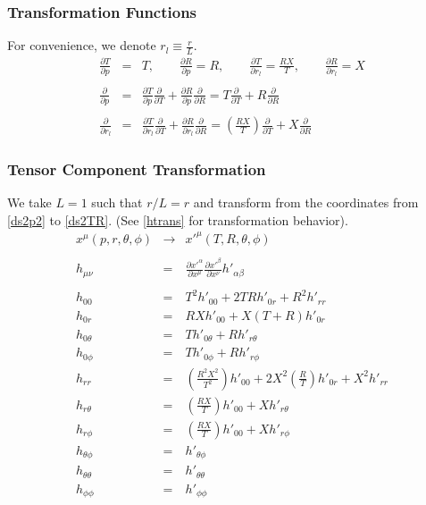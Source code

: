 \documentclass[10pt,letterpaper]{article}
\numberwithin{equation}{section}
\begin{document}
\subsubsection{Transformation Functions}
For convenience, we denote $r_l \equiv \frac{r}{L}$.
\begin{eqnarray}
\frac{\partial T}{\partial p} &=& T,\qquad \frac{\partial R}{\partial p} = R,\qquad
\frac{\partial T}{\partial r_l} = \frac{RX}{T},\qquad \frac{\partial R}{\partial r_l} = X
\\ \nonumber\\
\frac{\partial}{\partial p} &=& \frac{\partial T}{\partial p}\frac{\partial}{\partial T} + \frac{\partial R}{\partial p}\frac{\partial}{\partial R} = T\frac{\partial}{\partial T} + R\frac{\partial}{\partial R}
\\ \nonumber\\
\frac{\partial}{\partial r_l} &=& \frac{\partial T}{\partial r_l}\frac{\partial}{\partial T} + \frac{\partial R}{\partial r_l}\frac{\partial}{\partial R} = \left(\frac{RX}{T}\right)\frac{\partial}{\partial T} + X\frac{\partial}{\partial R}
\end{eqnarray}
%
\subsubsection{Tensor Component Transformation}
We take $L=1$ such that $r/L=r$ and transform from the coordinates from \eqref{ds2p2} to \eqref{ds2TR}. (See \eqref{htrans} for transformation behavior).
\begin{eqnarray}
x^\mu (p,r,\theta,\phi) &\to& x'^\mu (T,R,\theta,\phi)
\\ \nonumber\\
h_{\mu\nu} &=& \frac{\partial x'^\alpha}{\partial x^\mu }\frac{\partial x'^\beta}{\partial x^\nu} h'_{\alpha\beta}
\\ \nonumber\\
h_{00} &=&  T^2 h'_{00} +2 TR h'_{0r} + R^2 h'_{rr}
\nonumber\\
h_{0r} &=& RX h'_{00} + X(T+R)h'_{0r}
\nonumber\\
h_{0\theta} &=&T h'_{0\theta} + Rh'_{r\theta}
\nonumber\\
h_{0\phi} &=&Th'_{0\phi} + R h'_{r\phi}
\nonumber\\
h_{rr} &=&  \left(\frac{R^2X^2}{T^2}\right)h'_{00} + 2X^2\left(\frac{R}{T}\right)h'_{0r}+X^2 h'_{rr}
\nonumber\\
h_{r\theta} &=&  \left(\frac{RX}{T}\right) h'_{00} + Xh'_{r\theta}
\nonumber\\
h_{r\phi} &=& \left(\frac{RX}{T}\right) h'_{00} + Xh'_{r\phi}
\nonumber\\
h_{\theta\phi} &=& h'_{\theta\phi}
\nonumber\\
h_{\theta\theta} &=& h'_{\theta\theta}
\nonumber\\
h_{\phi\phi} &=& h'_{\phi\phi}
\end{eqnarray}
\end{document}
